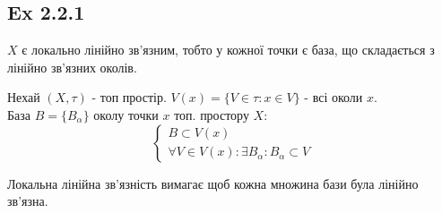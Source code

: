\documentclass[11pt, a4paper]{article} %
\newcommand{\R}{\mathbb{R}}
\begin{document}
\subsection*{Ex 2.2.1}
\begin{mdframed}
    $X$ є локально лінійно зв'язним, тобто у кожної точки є база, що складається з лінійно зв'язних околів.
\end{mdframed}

\begin{mdframed}[backgroundcolor=blue!10]
    Нехай $(X, \tau)$ - топ простір. $V(x) = \{V\in\tau : x\in V\}$ - всі околи $x$.\\
    База $B = \{B_\alpha\}$ околу точки $x$ топ. простору $X$:
    \[
    \begin{cases}
        B \subset V(x)\\
        \forall V\in V(x): \exists B_\alpha: B_\alpha \subset V
    \end{cases}    
    \]
\end{mdframed}

Локальна лінійна зв'язність вимагає щоб кожна множина бази була лінійно зв'язна.


        


\end{document}
